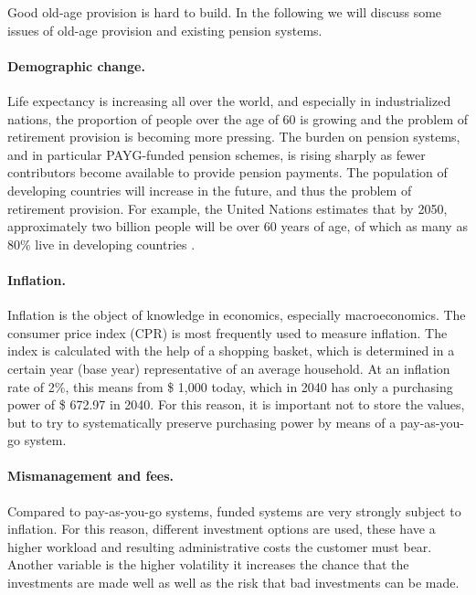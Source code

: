 Good old-age provision is hard to build. In the following we will discuss some issues of old-age provision and existing pension systems.

\paragraph{Demographic change.} Life expectancy is increasing all over the world, and especially in industrialized nations, the proportion of people over the age of 60 is growing and the problem of retirement provision is becoming more pressing. The burden on pension systems, and in particular PAYG-funded pension schemes, is rising sharply as fewer contributors become available to provide pension payments. The population of developing countries will increase in the future, and thus the problem of retirement provision. For example, the United Nations estimates that by 2050, approximately two billion people will be over 60 years of age, of which as many as 80\% live in developing countries
\cite{noauthor_pensions_2009}.


\paragraph{Inflation.}  Inflation is the object of knowledge in economics, especially macroeconomics. The consumer price index (CPR) is most frequently used to measure inflation. The index is calculated with the help of a shopping basket, which is determined in a certain year (base year) representative of an average household. 
At an inflation rate of 2\%, this means from \$ 1,000 today, which in 2040 has only a purchasing power of \$ 672.97 in 2040. 
For this reason, it is important not to store the values, but to try to systematically preserve purchasing power by means of a pay-as-you-go system.

\paragraph{Mismanagement and fees.} Compared to pay-as-you-go systems, funded systems are very strongly subject to inflation. For this reason, different investment options are used, these have a higher workload and resulting administrative costs the customer must bear. Another variable is the higher volatility it increases the chance that the investments are made well as well as the risk that bad investments can be made.

